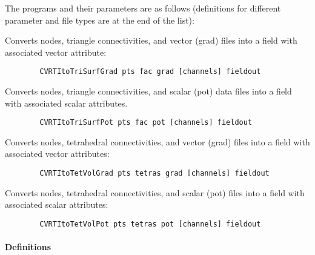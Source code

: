 The programs and their parameters are as follows (definitions for different parameter and file types are at the end of the list):
%
\begin{description}
   Converts nodes, triangle connectivities, and
        vector (grad) files into a field with associated vector attribute:\\
        \begin{verbatim}
        CVRTItoTriSurfGrad pts fac grad [channels] fieldout
        \end{verbatim}
   Converts nodes, triangle connectivities, and
        scalar (pot) data files into a field with associated scalar
        attributes. 
        \begin{verbatim}
        CVRTItoTriSurfPot pts fac pot [channels] fieldout
        \end{verbatim}
   Converts nodes, tetrahedral connectivities, and
        vector (grad) files into a field with associated vector
        attributes:\\
        \begin{verbatim}
        CVRTItoTetVolGrad pts tetras grad [channels] fieldout
        \end{verbatim}
   Converts nodes, tetrahedral connectivities, and
        scalar (pot) files into a field with associated scalar attributes:\\
        \begin{verbatim}
        CVRTItoTetVolPot pts tetras pot [channels] fieldout
        \end{verbatim}
\end{description}

\paragraph{Definitions}

